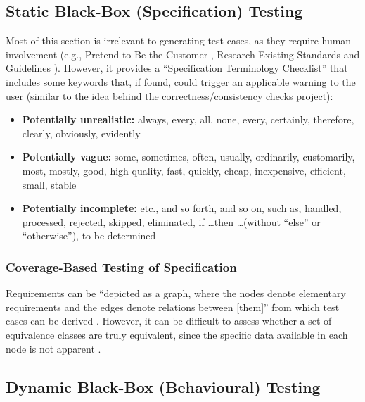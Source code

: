 \subsection{Static Black-Box (Specification) Testing
      \cite[pp.~56-62]{patton_software_2006}}

Most of this section is irrelevant to generating test cases, as they require
human involvement  (e.g., Pretend to Be the Customer
\cite[pp.~57-58]{patton_software_2006}, Research Existing Standards and
Guidelines \cite[pp.~58-59]{patton_software_2006}). However, it provides a
``Specification Terminology Checklist'' \cite[p.~61]{patton_software_2006} that
includes some keywords that, if found, could trigger an applicable warning to
the user (similar to the idea behind the correctness/consistency checks
project):

\begin{itemize}
      \item \textbf{Potentially unrealistic:} always, every, all, none, every,
            certainly, therefore, clearly, obviously, evidently
      \item \textbf{Potentially vague:} some, sometimes, often, usually,
            ordinarily, customarily, most, mostly, good, high-quality, fast,
            quickly, cheap, inexpensive, efficient, small, stable
      \item \textbf{Potentially incomplete:} etc., and so forth, and so on,
            such as, handled, processed, rejected, skipped, eliminated,
            if \dots then \dots (without ``else'' or ``otherwise''),
            to be determined \cite[p.~408]{van_vliet_software_2000}
\end{itemize}

\subsubsection{Coverage-Based Testing of Specification
      \cite[pp.~425-426]{van_vliet_software_2000}}

Requirements can be ``depicted as a graph, where the nodes denote elementary
requirements and the edges denote relations between [them]'' from which test
cases can be derived \cite[p.~425]{van_vliet_software_2000}. However, it can
be difficult to assess whether a set of equivalence classes are truly
equivalent, since the specific data available in each node is not apparent
\cite[p.~426]{van_vliet_software_2000}.

\subsection{Dynamic Black-Box (Behavioural) Testing
      \cite[pp.~64-65]{patton_software_2006}}

